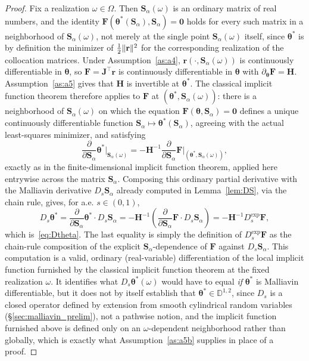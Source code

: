 \documentclass[11pt, a4paper]{article}
\theoremstyle{theoremstyle}
\theoremstyle{definitionstyle}
\newcommand{\pdv}[1]{\frac{\partial}{\partial#1}}
\DeclarePairedDelimiter{\norm}{\lVert}{\rVert}
\begin{document}
\begin{proof}
    Fix a realization $\omega \in \Omega$. Then $\mathbf S_\alpha(\omega)$ is an ordinary matrix of real numbers, and the identity $\mathbf F (\boldsymbol\theta^*(\mathbf S_\alpha), \mathbf S_\alpha) = \mathbf 0$ holds for every such matrix in a neighborhood of $\mathbf S_\alpha(\omega)$, not merely at the single point $\mathbf S_\alpha(\omega)$ itself, since $\boldsymbol\theta^*$ is by definition the minimizer of $\frac 12 \norm{\mathbf r}^2$ for the corresponding realization of the collocation matrices. Under Assumption~\ref{as:a4}, $\mathbf r (\cdot, \mathbf S_\alpha(\omega))$ is continuously differentiable in $\boldsymbol\theta$, so $\mathbf F = \mathbf J^\top \mathbf r$ is continuously differentiable in $\boldsymbol\theta$ with $\partial_{\boldsymbol\theta}\mathbf F = \mathbf H$. Assumption~\ref{as:a5} gives that $\mathbf H$ is invertible at $\boldsymbol\theta^*$. The classical implicit function theorem therefore applies to $\mathbf F$ at $(\boldsymbol\theta^*, \mathbf S_\alpha(\omega))$: there is a neighborhood of $\mathbf S_\alpha(\omega)$ on which the equation $\mathbf F (\boldsymbol\theta, \mathbf S_\alpha) = \mathbf 0$ defines a unique continuously differentiable function $\mathbf S_\alpha \mapsto \boldsymbol\theta^*(\mathbf S_\alpha)$, agreeing with the actual least-squares minimizer, and satisfying
    \begin{equation}
        \pdv{\mathbf S_\alpha}\boldsymbol\theta^* \bigg|_{\mathbf S_\alpha(\omega)} = -\mathbf H^{-1} \pdv{\mathbf S_\alpha}\mathbf F \bigg|_{(\boldsymbol\theta^*, \mathbf S_\alpha(\omega))},
    \end{equation}
    exactly as in the finite-dimensional implicit function theorem, applied here entrywise across the matrix $\mathbf S_\alpha$. Composing this ordinary partial derivative with the Malliavin derivative $D_s \mathbf S_\alpha$ already computed in Lemma~\ref{lem:DS}, via the chain rule, gives, for a.e. $s \in (0, 1)$,
    \begin{equation}
        D_s \boldsymbol\theta^* = \pdv{\mathbf S_\alpha}{\boldsymbol\theta^*} \cdot D_s \mathbf S_\alpha = -\mathbf H^{-1} \left ( \pdv{\mathbf S_\alpha}{\mathbf F} \cdot D_s \mathbf S_\alpha \right ) = -\mathbf H^{-1} D_s^{\exp}\mathbf F,
    \end{equation}
    which is~\eqref{eq:Dtheta}. The last equality is simply the definition of $D_s^{\exp}\mathbf F$ as the chain-rule composition of the explicit $\mathbf S_\alpha$-dependence of $\mathbf F$ against $D_s \mathbf S_\alpha$. This computation is a valid, ordinary (real-variable) differentiation of the local implicit function furnished by the classical implicit function theorem at the fixed realization $\omega$. It identifies what $D_s\boldsymbol\theta^*(\omega)$ would have to equal \emph{if} $\boldsymbol\theta^*$ is Malliavin differentiable, but it does not by itself establish that $\boldsymbol\theta^*\in\mathbb D^{1,2}$, since $D_s$ is a closed operator defined by extension from smooth cylindrical random variables (\S\ref{sec:malliavin_prelim}), not a pathwise notion, and the implicit function furnished above is defined only on an $\omega$-dependent neighborhood rather than globally, which is exactly what Assumption~\ref{as:a5b} supplies in place of a proof.


\end{proof}
\end{document}
